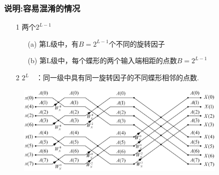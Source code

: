 \documentclass[notheorems,compress,mathserif,table]{beamer}
\begin{document}
\begin{frame}[shrink]\frametitle{说明:容易混淆的情况}%
\begin{enumerate}
  \item [1]两个$2^{L-1}$
  \begin{enumerate}
           \item [(a)] 第L级中，有$B=2^{L-1}$个不同的旋转因子
           \item [(b)] 第L级中，每个蝶形的两个输入端相距的点数$B=2^{L-1}$
  \end{enumerate}
  \item [2] $ 2^{L}\quad$：同一级中具有同一旋转因子的不同蝶形相邻的点数.
\end{enumerate}
\begin{figure}[h]
  \centering
  \includegraphics[width=0.9\textwidth]{8dftThird.jpg}
\end{figure}
\end{frame}
\end{document}
